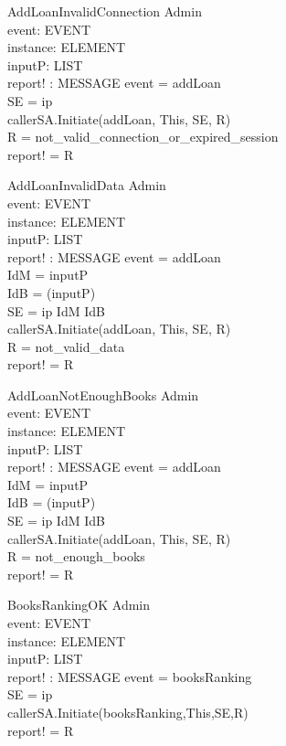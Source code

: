 \begin{schema} {AddLoanInvalidConnection}
\Xi Admin \\
event: EVENT \\
instance: ELEMENT \\
inputP: LIST \\
report! : MESSAGE 
\where event = addLoan \\
SE = \lseq ip \rseq \\
callerSA.Initiate(addLoan, This, SE, R) \\
R = not\_valid\_connection\_or\_expired\_session \\
report! = R 
\end{schema}

\begin{schema}{AddLoanInvalidData}
\Xi Admin \\
event: EVENT \\
instance: ELEMENT \\
inputP: LIST \\
report! : MESSAGE 
\where event = addLoan \\
IdM = \head inputP \\ 
IdB = \head (\tail inputP) \\ 
SE = \lseq ip IdM IdB \rseq \\
callerSA.Initiate(addLoan, This, SE, R) \\
R = not\_valid\_data \\ 
report! = R
\end{schema}


\begin{schema}{AddLoanNotEnoughBooks}
\Xi Admin \\
event: EVENT \\
instance: ELEMENT \\
inputP: LIST \\
report! : MESSAGE 
\where event = addLoan \\
IdM = \head inputP \\ 
IdB = \head (\tail inputP) \\ 
SE = \lseq ip IdM IdB \rseq \\
callerSA.Initiate(addLoan, This, SE, R) \\
R = not\_enough\_books \\ 
report! = R
\end{schema}

\begin{schema}{BooksRankingOK}
\Xi Admin \\
event: EVENT \\
instance: ELEMENT \\
inputP: LIST \\
report! : MESSAGE 
\where event = booksRanking \\ 
SE = \lseq ip \rseq \\
callerSA.Initiate(booksRanking,This,SE,R) \\
report! = R
\end{schema}

